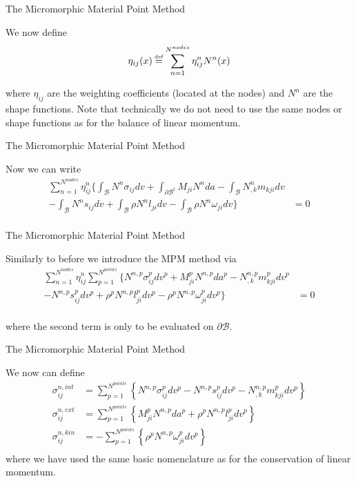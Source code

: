 \documentclass[11pt]{beamer}
\newcommand\defeq{\mathrel{\stackrel{\makebox[0pt]{\mbox{\normalfont\tiny def}}}{=}}}
\begin{document}
\begin{frame}{The Micromorphic Material Point Method}

We now define
\begin{align*}
\eta_{ij}(x) &\defeq \sum_{n=1}^{N^{nodes}} \eta_{ij}^n N^n(x)\\
\end{align*}

where $\eta_{ij}$ are the weighting coefficients (located at the nodes) and $N^n$ are the shape functions. Note that technically we do not need to use the same nodes or shape functions as for the balance of linear momentum.

\end{frame}

\begin{frame}{The Micromorphic Material Point Method}

Now we can write
\begin{align*}
\sum_{n=1}^{N^{nodes}} \eta_{ij}^n \bigg\{\int_{\mathcal{B}} N^n \sigma_{ij} dv + \int_{\partial \mathcal{B}^t} M_{ji} N^n da - \int_{\mathcal{B}} N_{,k}^n m_{kji}dv&\\ - \int_{\mathcal{B}} N^n s_{ij}dv + \int_{\mathcal{B}} \rho N^n l_{ji}dv - \int_{\mathcal{B}} \rho N^n \omega_{ji} dv\bigg\}&= 0\\
\end{align*}

\end{frame}

\begin{frame}{The Micromorphic Material Point Method}

Similarly to before we introduce the MPM method via
\begin{align*}
\sum_{n=1}^{N^{nodes}} \eta_{ij}^n \sum_{p=1}^{N^{points}}\bigg\{ N^{n,p} \sigma_{ij}^p dv^p +  M_{ji}^p N^{n,p} da^p - N_{,k}^{n,p} m_{kji}^p dv^p&\\ - N^{n,p} s_{ij}^{p} dv^p + \rho^p N^{n,p} l_{ji}^p dv^p - \rho^p N^{n,p} \omega_{ji}^p dv^p\bigg\}&= 0\\
\end{align*}

where the second term is only to be evaluated on $\partial \mathcal{B}$.

\end{frame}

\begin{frame}{The Micromorphic Material Point Method}

We now can define
\begin{align*}
\sigma^{n,int}_{ij} &= \sum_{p=1}^{N^{points}} \left\{ N^{n,p} \sigma_{ij}^p dv^p - N^{n,p} s_{ij}^{p} dv^p - N_{,k}^{n,p} m_{kji}^p dv^p\right\}\\
\sigma^{n,ext}_{ij} &= \sum_{p=1}^{N^{points}} \left\{M_{ji}^p N^{n,p} da^p +  \rho^p N^{n,p} l_{ji}^p dv^p\right\}\\
\sigma^{n,kin}_{ij} &= -\sum_{p=1}^{N^{points}} \left\{\rho^p N^{n,p} \omega_{ji}^p dv^p\right\}\\
\end{align*}
where we have used the same basic nomenclature as for the conservation of linear momentum.
\end{frame}
\end{document}
